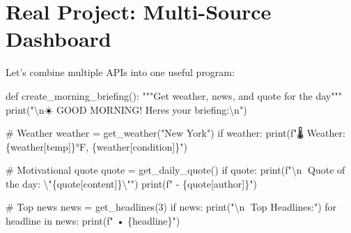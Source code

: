 \documentclass[
  letterpaper,
  DIV=11,
  numbers=noendperiod,
  oneside]{scrreprt}
\newenvironment{Shaded}{}{}
\newcommand{\BuiltInTok}[1]{\textcolor[rgb]{0.84,0.23,0.29}{#1}}
\newcommand{\CharTok}[1]{\textcolor[rgb]{0.01,0.18,0.38}{#1}}
\newcommand{\CommentTok}[1]{\textcolor[rgb]{0.42,0.45,0.49}{#1}}
\newcommand{\ControlFlowTok}[1]{\textcolor[rgb]{0.84,0.23,0.29}{#1}}
\newcommand{\DecValTok}[1]{\textcolor[rgb]{0.00,0.36,0.77}{#1}}
\newcommand{\KeywordTok}[1]{\textcolor[rgb]{0.84,0.23,0.29}{#1}}
\newcommand{\NormalTok}[1]{\textcolor[rgb]{0.14,0.16,0.18}{#1}}
\newcommand{\OperatorTok}[1]{\textcolor[rgb]{0.14,0.16,0.18}{#1}}
\newcommand{\SpecialCharTok}[1]{\textcolor[rgb]{0.00,0.36,0.77}{#1}}
\newcommand{\SpecialStringTok}[1]{\textcolor[rgb]{0.01,0.18,0.38}{#1}}
\newcommand{\StringTok}[1]{\textcolor[rgb]{0.01,0.18,0.38}{#1}}
\begin{document}
\section{Real Project: Multi-Source
Dashboard}\label{real-project-multi-source-dashboard}

Let's combine multiple APIs into one useful program:

\begin{Shaded}
\begin{Highlighting}[]
\KeywordTok{def}\NormalTok{ create\_morning\_briefing():}
    \CommentTok{"""Get weather, news, and quote for the day"""}
    \BuiltInTok{print}\NormalTok{(}\StringTok{"}\CharTok{\textbackslash{}n}\StringTok{☀️ GOOD MORNING! Here\textquotesingle{}s your briefing:}\CharTok{\textbackslash{}n}\StringTok{"}\NormalTok{)}
    
    \CommentTok{\# Weather}
\NormalTok{    weather }\OperatorTok{=}\NormalTok{ get\_weather(}\StringTok{"New York"}\NormalTok{)}
    \ControlFlowTok{if}\NormalTok{ weather:}
        \BuiltInTok{print}\NormalTok{(}\SpecialStringTok{f"🌡️ Weather: }\SpecialCharTok{\{}\NormalTok{weather[}\StringTok{\textquotesingle{}temp\textquotesingle{}}\NormalTok{]}\SpecialCharTok{\}}\SpecialStringTok{°F, }\SpecialCharTok{\{}\NormalTok{weather[}\StringTok{\textquotesingle{}condition\textquotesingle{}}\NormalTok{]}\SpecialCharTok{\}}\SpecialStringTok{"}\NormalTok{)}
    
    \CommentTok{\# Motivational quote}
\NormalTok{    quote }\OperatorTok{=}\NormalTok{ get\_daily\_quote()}
    \ControlFlowTok{if}\NormalTok{ quote:}
        \BuiltInTok{print}\NormalTok{(}\SpecialStringTok{f"}\CharTok{\textbackslash{}n}\SpecialStringTok{💭 Quote of the day: }\CharTok{\textbackslash{}"}\SpecialCharTok{\{}\NormalTok{quote[}\StringTok{\textquotesingle{}content\textquotesingle{}}\NormalTok{]}\SpecialCharTok{\}}\CharTok{\textbackslash{}"}\SpecialStringTok{"}\NormalTok{)}
        \BuiltInTok{print}\NormalTok{(}\SpecialStringTok{f"   {-} }\SpecialCharTok{\{}\NormalTok{quote[}\StringTok{\textquotesingle{}author\textquotesingle{}}\NormalTok{]}\SpecialCharTok{\}}\SpecialStringTok{"}\NormalTok{)}
    
    \CommentTok{\# Top news}
\NormalTok{    news }\OperatorTok{=}\NormalTok{ get\_headlines(}\DecValTok{3}\NormalTok{)}
    \ControlFlowTok{if}\NormalTok{ news:}
        \BuiltInTok{print}\NormalTok{(}\StringTok{"}\CharTok{\textbackslash{}n}\StringTok{📰 Top Headlines:"}\NormalTok{)}
        \ControlFlowTok{for}\NormalTok{ headline }\KeywordTok{in}\NormalTok{ news:}
            \BuiltInTok{print}\NormalTok{(}\SpecialStringTok{f"  • }\SpecialCharTok{\{}\NormalTok{headline}\SpecialCharTok{\}}\SpecialStringTok{"}\NormalTok{)}
    

\end{Highlighting}
\end{Shaded}
\end{document}
